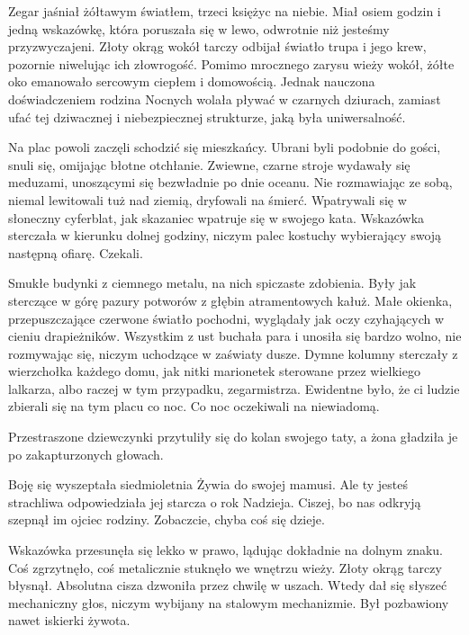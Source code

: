 Zegar jaśniał żółtawym światłem, trzeci księżyc na niebie.
Miał osiem godzin i jedną wskazówkę, która poruszała się w lewo, odwrotnie niż jesteśmy przyzwyczajeni.
Złoty okrąg wokół tarczy odbijał światło trupa i jego krew, pozornie niwelując ich złowrogość.
Pomimo mrocznego zarysu wieży wokół, żółte oko emanowało sercowym ciepłem i domowością.
Jednak nauczona doświadczeniem rodzina Nocnych wolała pływać w czarnych dziurach, zamiast ufać tej dziwacznej i niebezpiecznej strukturze, jaką była uniwersalność.

Na plac powoli zaczęli schodzić się mieszkańcy.
Ubrani byli podobnie do gości, snuli się, omijając błotne otchłanie.
Zwiewne, czarne stroje wydawały się meduzami, unoszącymi się bezwładnie po dnie oceanu.
Nie rozmawiając ze sobą, niemal lewitowali tuż nad ziemią, dryfowali na śmierć.
Wpatrywali się w słoneczny cyferblat, jak skazaniec wpatruje się w swojego kata.
Wskazówka sterczała w kierunku dolnej godziny, niczym palec kostuchy wybierający swoją następną ofiarę.
Czekali.

Smukłe budynki z ciemnego metalu, na nich spiczaste zdobienia. 
Były jak sterczące w górę pazury potworów z głębin atramentowych kałuż.
Małe okienka, przepuszczające czerwone światło pochodni, wyglądały jak oczy czyhających w cieniu drapieżników.
Wszystkim z ust buchała para i unosiła się bardzo wolno, nie rozmywając się, niczym uchodzące w zaświaty dusze.
Dymne kolumny sterczały z wierzchołka każdego domu, jak nitki marionetek sterowane przez wielkiego lalkarza, albo raczej w tym przypadku, zegarmistrza.
Ewidentne było, że ci ludzie zbierali się na tym placu co noc.
Co noc oczekiwali na niewiadomą.

Przestraszone dziewczynki przytuliły się do kolan swojego taty, a żona gładziła je po zakapturzonych głowach.
\begin{dialogue}
	\ds{} Boję się \dm{} wyszeptała siedmioletnia Żywia do swojej mamusi.
	\ds{} Ale ty jesteś strachliwa \dm{} odpowiedziała jej starcza o rok Nadzieja.
	\ds{} Ciszej, bo nas odkryją \dm{} szepnął im ojciec rodziny. \dm{} Zobaczcie, chyba coś się dzieje.
\end{dialogue}

Wskazówka przesunęła się lekko w prawo, lądując dokładnie na dolnym znaku. 
Coś zgrzytnęło, coś metalicznie stuknęło we wnętrzu wieży.
Złoty okrąg tarczy błysnął.
Absolutna cisza dzwoniła przez chwilę w uszach.
Wtedy dał się słyszeć mechaniczny głos, niczym wybijany na stalowym mechanizmie.
Był pozbawiony nawet iskierki żywota.

